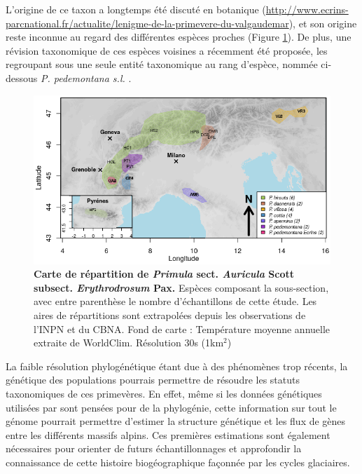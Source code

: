 L'origine de ce taxon a longtemps été discuté en botanique (\url{http://www.ecrins-parcnational.fr/actualite/lenigme-de-la-primevere-du-valgaudemar}), et son origine reste inconnue au regard des différentes espèces proches (Figure \ref{carte}). De plus, une révision taxonomique de ces espèces voisines a récemment été proposée, les regroupant sous une seule entité taxonomique au rang d'espèce, nommée ci-dessous \textit{P. pedemontana s.l.} \citep{Boucher2016a}. 
  
\begin{figure}[!ht]
    \centering
    \includegraphics[width=1\textwidth]{fig/carte.png}
    \caption{\textbf{Carte de répartition de \textit{Primula} sect. \textit{Auricula} Scott subsect. \textit{Erythrodrosum} Pax.} Espèces composant la sous-section, avec entre parenthèse le nombre d'échantillons de cette étude. Les aires de répartitions sont extrapolées depuis les observations de l'INPN et du CBNA. Fond de carte : Température moyenne annuelle extraite de WorldClim. Résolution 30s (1km$^{2}$)}
    \label{carte}
    \centering
\end{figure} 
 
La faible résolution phylogénétique étant due à des phénomènes trop récents, la génétique des populations pourrais permettre de résoudre les statuts taxonomiques de ces primevères. En effet, même si les données génétiques utilisées par \citet{Boucher2016a} sont pensées pour de la phylogénie, cette information sur tout le génome pourrait permettre d'estimer la structure génétique et les flux de gènes entre les différents massifs alpins. Ces premières estimations sont également nécessaires pour orienter de futurs échantillonnages et approfondir la connaissance de cette histoire biogéographique façonnée par les cycles glaciaires. 
 
